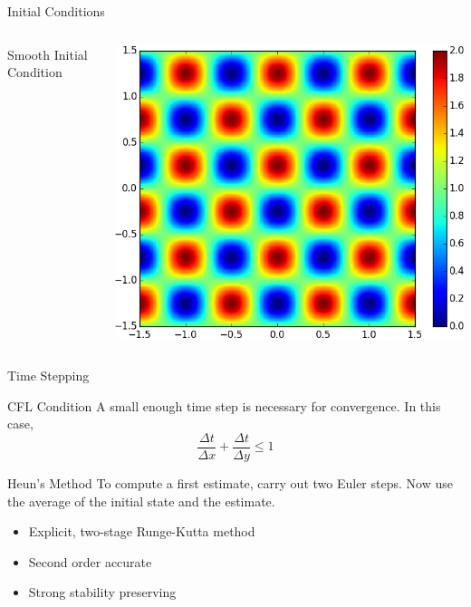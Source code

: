 \documentclass{beamer}
\begin{document}
\begin{frame}{Initial Conditions}
\begin{columns}
            \centering
            Smooth Initial Condition

            \includegraphics[width=\textwidth]{initcond_smooth.png}
        \end{columns}
    \end{frame}

    \begin{frame}{Time Stepping}
        \begin{block}{CFL Condition}
            A small enough time step is necessary for convergence. In this case,
            \begin{equation*}
                \frac{\Delta t}{\Delta x} + \frac{\Delta t}{\Delta y} \leq 1
            \end{equation*}
        \end{block}

        \vfill

        \begin{block}{Heun's Method}
            To compute a first estimate, carry out two Euler steps.
            Now use the average of the initial state and the estimate.
            \begin{itemize}
                \item Explicit, two-stage Runge-Kutta method
                \item Second order accurate
                \item Strong stability preserving
            \end{itemize}
        \end{block}
    \end{frame}
\end{document}
